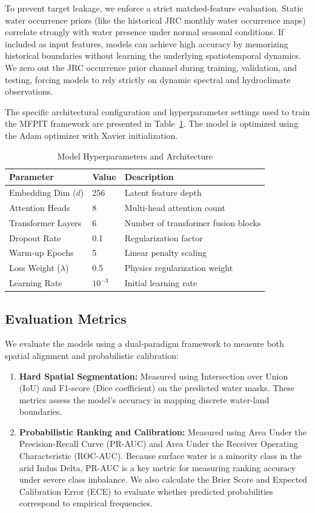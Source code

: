 \documentclass[preprint,12pt]{elsarticle}
\begin{document}
To prevent target leakage, we enforce a strict matched-feature evaluation. Static water occurrence priors (like the historical JRC monthly water occurrence maps) correlate strongly with water presence under normal seasonal conditions. If included as input features, models can achieve high accuracy by memorizing historical boundaries without learning the underlying spatiotemporal dynamics. We zero out the JRC occurrence prior channel during training, validation, and testing, forcing models to rely strictly on dynamic spectral and hydroclimate observations.

The specific architectural configuration and hyperparameter settings used to train the MFPIT framework are presented in Table~\ref{tab:hyperparams}. The model is optimized using the Adam optimizer with Xavier initialization.

\begin{table}[htbp]
\caption{Model Hyperparameters and Architecture}
\label{tab:hyperparams}
\centering
\begin{tabular}{lll}
\toprule
\textbf{Parameter} & \textbf{Value} & \textbf{Description} \\
\midrule
Embedding Dim ($d$) & 256 & Latent feature depth \\
Attention Heads & 8 & Multi-head attention count \\
Transformer Layers & 6 & Number of transformer fusion blocks \\
Dropout Rate & 0.1 & Regularization factor \\
Warm-up Epochs & 5 & Linear penalty scaling \\
Loss Weight ($\lambda$) & 0.5 & Physics regularization weight \\
Learning Rate & $10^{-3}$ & Initial learning rate \\
\bottomrule
\end{tabular}
\end{table}

\subsection{Evaluation Metrics}
We evaluate the models using a dual-paradigm framework to measure both spatial alignment and probabilistic calibration:
\begin{enumerate}
    \item \textbf{Hard Spatial Segmentation:} Measured using Intersection over Union (IoU) and F1-score (Dice coefficient) on the predicted water masks. These metrics assess the model's accuracy in mapping discrete water-land boundaries.
    \item \textbf{Probabilistic Ranking and Calibration:} Measured using Area Under the Precision-Recall Curve (PR-AUC) and Area Under the Receiver Operating Characteristic (ROC-AUC). Because surface water is a minority class in the arid Indus Delta, PR-AUC is a key metric for measuring ranking accuracy under severe class imbalance. We also calculate the Brier Score and Expected Calibration Error (ECE) to evaluate whether predicted probabilities correspond to empirical frequencies.
\end{enumerate}
\end{document}
